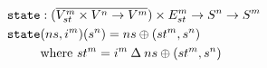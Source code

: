 \documentclass[preview]{standalone}
\begin{document}
\begin{align*}
  \texttt{state} &: (\overline{V^m_{st} \times V^n \rightarrow V^m}) \times E^m_{st} \rightarrow S^n \rightarrow S^m \\
  \texttt{state} &(ns,i^m)(s^n) = ns \oplus (st^m, s^n) \\
                 &\text{where}\ st^m = i^m \mathbin{\Delta} ns \oplus (st^m, s^n) 
\end{align*}
\end{document}
